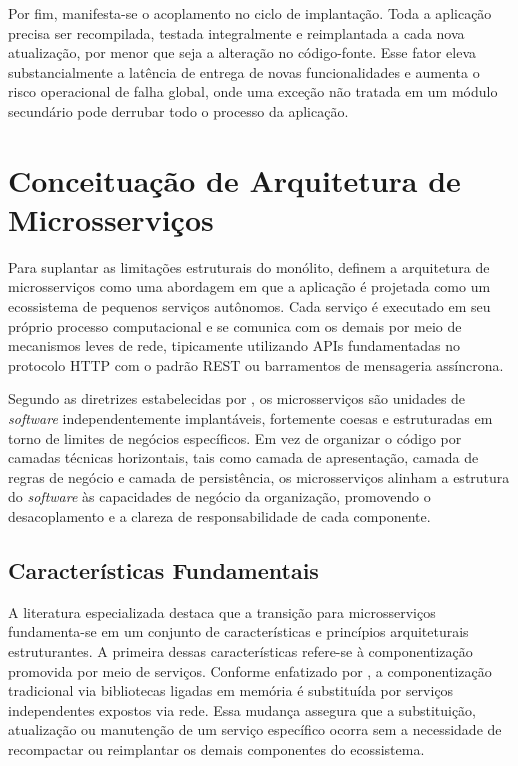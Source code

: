 Por fim, manifesta-se o acoplamento no ciclo de implantação. Toda a aplicação precisa ser recompilada, testada integralmente e reimplantada a cada nova atualização, por menor que seja a alteração no código-fonte. Esse fator eleva substancialmente a latência de entrega de novas funcionalidades e aumenta o risco operacional de falha global, onde uma exceção não tratada em um módulo secundário pode derrubar todo o processo da aplicação.

\section{Conceituação de Arquitetura de Microsserviços}

Para suplantar as limitações estruturais do monólito,  definem a arquitetura de microsserviços como uma abordagem em que a aplicação é projetada como um ecossistema de pequenos serviços autônomos. Cada serviço é executado em seu próprio processo computacional e se comunica com os demais por meio de mecanismos leves de rede, tipicamente utilizando APIs fundamentadas no protocolo HTTP com o padrão REST ou barramentos de mensageria assíncrona.

Segundo as diretrizes estabelecidas por , os microsserviços são unidades de \textit{software} independentemente implantáveis, fortemente coesas e estruturadas em torno de limites de negócios específicos. Em vez de organizar o código por camadas técnicas horizontais, tais como camada de apresentação, camada de regras de negócio e camada de persistência, os microsserviços alinham a estrutura do \textit{software} às capacidades de negócio da organização, promovendo o desacoplamento e a clareza de responsabilidade de cada componente.

\subsection{Características Fundamentais}

A literatura especializada destaca que a transição para microsserviços fundamenta-se em um conjunto de características e princípios arquiteturais estruturantes. A primeira dessas características refere-se à componentização promovida por meio de serviços. Conforme enfatizado por , a componentização tradicional via bibliotecas ligadas em memória é substituída por serviços independentes expostos via rede. Essa mudança assegura que a substituição, atualização ou manutenção de um serviço específico ocorra sem a necessidade de recompactar ou reimplantar os demais componentes do ecossistema.

